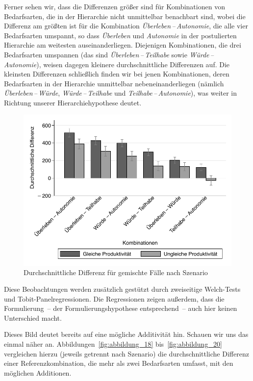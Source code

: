 \documentclass[justified,nobib,nohyper,symmetric,twoside]{tufte-book}
\begin{document}
Ferner sehen wir, dass die Differenzen größer sind für Kombinationen von Bedarfsarten, die in der Hierarchie nicht unmittelbar benachbart sind, wobei die Differenz am größten ist für die Kombination \textit{Überleben\,--\,Autonomie}, die alle vier Bedarfsarten umspannt, so dass \textit{Überleben} und \textit{Autonomie} in der postulierten Hierarchie am weitesten auseinanderliegen.
Diejenigen Kombinationen, die drei Bedarfsarten umspannen (das sind \textit{Überleben\,--\,Teilhabe} sowie \textit{Würde\,--\,Autonomie}), weisen dagegen kleinere durchschnittliche Differenzen auf.
Die kleinsten Differenzen schließlich finden wir bei jenen Kombinationen, deren Bedarfsarten in der Hierarchie unmittelbar nebeneinanderliegen (nämlich \textit{Überleben\,--\,Würde}, \textit{Würde\,--\,Teilhabe} und \textit{Teilhabe\,--\,Autonomie}), was weiter in Richtung unserer Hierarchiehypothese deutet.

\begin{figure}[t]\label{fig:abbildung_17}
   \center
   \caption{Durchschnittliche Differenz für gemischte Fälle nach Szenario}
   \includegraphics[width=0.99\linewidth]{figure_17.pdf}
\end{figure}

Diese Beobachtungen werden zusätzlich gestützt durch zweiseitige Welch-Tests und Tobit-Panelregres\-sionen.
Die Regressionen zeigen außerdem, dass die Formulierung~-- der Formulierungshypothese entsprechend~-- auch hier keinen Unterschied macht.

Dieses Bild deutet bereits auf eine mögliche Additivität hin.
Schauen wir uns das einmal näher an.
Abbildungen~\ref{fig:abbildung_18} bis~\ref{fig:abbildung_20} vergleichen hierzu (jeweils getrennt nach Szenario) die durchschnittliche Differenz einer Referenzkombination, die mehr als zwei Bedarfsarten umfasst, mit den möglichen Additionen.
\end{document}
